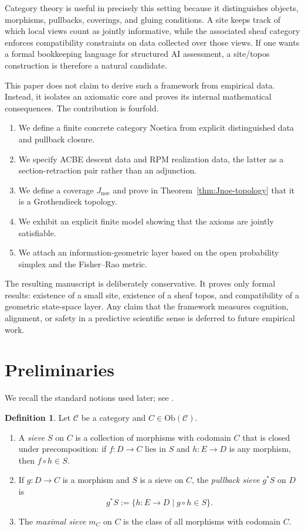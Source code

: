 \documentclass[11pt]{amsart}
\numberwithin{equation}{section}
\theoremstyle{definition}
\newtheorem{definition}[theorem]{Definition}
\theoremstyle{remark}
\newcommand{\Noetica}{\mathrm{Noetica}}
\newcommand{\Jnoe}{J_{\mathrm{noe}}}
\begin{document}
Category theory is useful in precisely this setting because it distinguishes objects, morphisms, pullbacks, coverings, and gluing conditions. A site keeps track of which local views count as jointly informative, while the associated sheaf category enforces compatibility constraints on data collected over those views. If one wants a formal bookkeeping language for structured AI assessment, a site/topos construction is therefore a natural candidate.

This paper does not claim to derive such a framework from empirical data. Instead, it isolates an axiomatic core and proves its internal mathematical consequences. The contribution is fourfold.
\begin{enumerate}[label=(\roman*)]
\item We define a finite concrete category \(\Noetica\) from explicit distinguished data and pullback closure.
\item We specify ACBE descent data and RPM realization data, the latter as a section-retraction pair rather than an adjunction.
\item We define a coverage \(\Jnoe\) and prove in Theorem~\ref{thm:Jnoe-topology} that it is a Grothendieck topology.
\item We exhibit an explicit finite model showing that the axioms are jointly satisfiable.
\item We attach an information-geometric layer based on the open probability simplex and the Fisher--Rao metric.
\end{enumerate}

The resulting manuscript is deliberately conservative. It proves only formal results: existence of a small site, existence of a sheaf topos, and compatibility of a geometric state-space layer. Any claim that the framework measures cognition, alignment, or safety in a predictive scientific sense is deferred to future empirical work.

\section{Preliminaries}

We recall the standard notions used later; see \cite{MacLane1998,MacLaneMoerdijk1992}.

\begin{definition}
Let \(\mathcal{C}\) be a category and \(C \in \mathrm{Ob}(\mathcal{C})\).
\begin{enumerate}[label=(\roman*)]
\item A \emph{sieve} \(S\) on \(C\) is a collection of morphisms with codomain \(C\) that is closed under precomposition: if \(f : D \to C\) lies in \(S\) and \(h : E \to D\) is any morphism, then \(f \circ h \in S\).
\item If \(g : D \to C\) is a morphism and \(S\) is a sieve on \(C\), the \emph{pullback sieve} \(g^{*}S\) on \(D\) is
\[
g^{*}S := \{h : E \to D \mid g \circ h \in S\}.
\]
\item The \emph{maximal sieve} \(m_C\) on \(C\) is the class of all morphisms with codomain \(C\).
\end{enumerate}
\end{definition}
\end{document}
